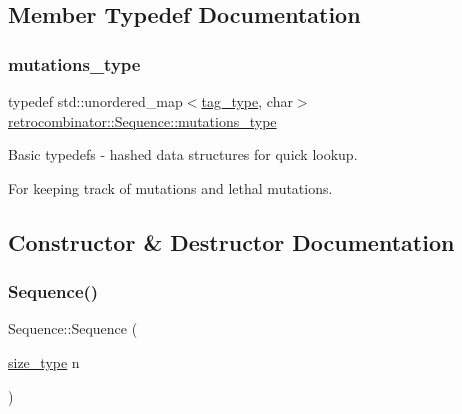 \subsection{Member Typedef Documentation}
\mbox{\label{classretrocombinator_1_1Sequence_a2abbaf2376f035a997e02c4afae9f476}} 
\subsubsection{\texorpdfstring{mutations\+\_\+type}{mutations\_type}}
{\footnotesize\ttfamily typedef std\+::unordered\+\_\+map$<$\hyperlink{constants_8h_afd7c6eb4293e8c4d12827609a9a34b9b}{tag\+\_\+type}, char$>$ \hyperlink{classretrocombinator_1_1Sequence_a2abbaf2376f035a997e02c4afae9f476}{retrocombinator\+::\+Sequence\+::mutations\+\_\+type}\hspace{0.3cm}{\ttfamily [private]}}



Basic typedefs -\/ hashed data structures for quick lookup. 

For keeping track of mutations and lethal mutations. 

\subsection{Constructor \& Destructor Documentation}
\mbox{\label{classretrocombinator_1_1Sequence_a04d0d6977316f2ab30844e584c4531ec}} 
\subsubsection{\texorpdfstring{Sequence()}{Sequence()}\hspace{0.1cm}{\footnotesize\ttfamily [1/3]}}
{\footnotesize\ttfamily Sequence\+::\+Sequence (\begin{DoxyParamCaption}\item[{\hyperlink{constants_8h_a8e1541b50cee66a791df4c437ccbb385}{size\+\_\+type}}]{n }\end{DoxyParamCaption})}



